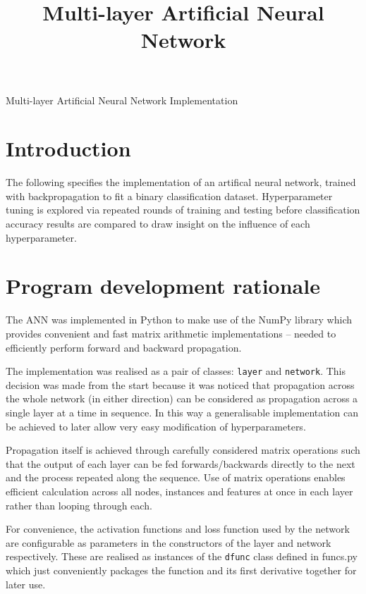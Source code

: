 \documentclass{article}
\begin{document}
\title{Multi-layer Artificial Neural Network}

\begin{center}
  \Large{Multi-layer Artificial Neural Network Implementation}
\end{center}

\section{Introduction}

The following specifies the implementation of an artifical neural
network, trained with backpropagation to fit a binary classification
dataset. Hyperparameter tuning is explored via repeated rounds of
training and testing before classification accuracy results are compared
to draw insight on the influence of each hyperparameter.

\vspace{-1em}
\section{Program development rationale}

The ANN was implemented in Python to make use of the NumPy library which
provides convenient and fast matrix arithmetic implementations --
needed to efficiently perform forward and backward propagation.

The implementation was realised as a pair of classes: \lstinline{layer}
and \lstinline{network}. This decision was made from the start because
it was noticed that propagation across the whole network (in either
direction) can be considered as propagation across a single layer at a
time in sequence. In this way a generalisable implementation can be
achieved to later allow very easy modification of hyperparameters.

Propagation itself is achieved through carefully considered matrix
operations such that the output of each layer can be fed
forwards/backwards directly to the next and the process repeated along
the sequence. Use of matrix operations enables efficient calculation
across all nodes, instances and features at once in each layer rather
than looping through each.

For convenience, the activation functions and loss function used by the
network are configurable as parameters in the constructors of the layer
and network respectively. These are realised as instances of the
\lstinline{dfunc} class defined in funcs.py which just conveniently
packages the function and its first derivative together for later use.
\end{document}
